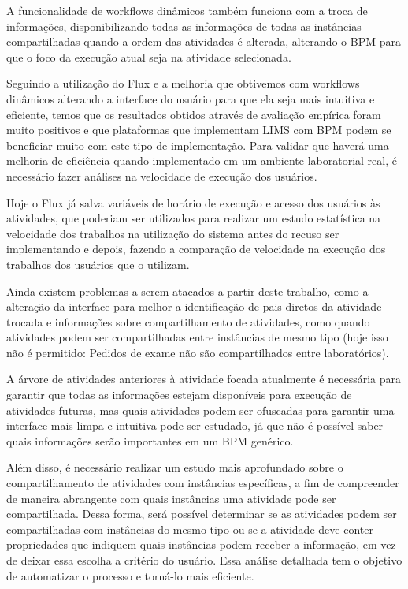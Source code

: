 A funcionalidade de workflows dinâmicos também funciona com a troca de informações, disponibilizando todas as informações de todas as instâncias compartilhadas quando a ordem das atividades é alterada, alterando o BPM para que o foco da execução atual seja na atividade selecionada.

Seguindo a utilização do Flux e a melhoria que obtivemos com workflows dinâmicos alterando a interface do usuário para que ela seja mais intuitiva e eficiente, temos que os resultados obtidos através de avaliação empírica foram muito positivos e que plataformas que implementam LIMS com BPM podem se beneficiar muito com este tipo de implementação. Para validar que haverá uma melhoria de eficiência quando implementado em um ambiente laboratorial real, é necessário fazer análises na velocidade de execução dos usuários.

Hoje o Flux já salva variáveis de horário de execução e acesso dos usuários às atividades, que poderiam ser utilizados para realizar um estudo estatística na velocidade dos trabalhos na utilização do sistema antes do recuso ser implementando e depois, fazendo a comparação de velocidade na execução dos trabalhos dos usuários que o utilizam.

Ainda existem problemas a serem atacados a partir deste trabalho, como a alteração da interface para melhor a identificação de pais diretos da atividade trocada e informações sobre compartilhamento de atividades, como quando atividades podem ser compartilhadas entre instâncias de mesmo tipo (hoje isso não é permitido: Pedidos de exame não são compartilhados entre laboratórios).

A árvore de atividades anteriores à atividade focada atualmente é necessária para garantir que todas as informações estejam disponíveis para execução de atividades futuras, mas quais atividades podem ser ofuscadas para garantir uma interface mais limpa e intuitiva pode ser estudado, já que não é possível saber quais informações serão importantes em um BPM genérico.

Além disso, é necessário realizar um estudo mais aprofundado sobre o compartilhamento de atividades com instâncias específicas, a fim de compreender de maneira abrangente com quais instâncias uma atividade pode ser compartilhada. Dessa forma, será possível determinar se as atividades podem ser compartilhadas com instâncias do mesmo tipo ou se a atividade deve conter propriedades que indiquem quais instâncias podem receber a informação, em vez de deixar essa escolha a critério do usuário. Essa análise detalhada tem o objetivo de automatizar o processo e torná-lo mais eficiente.